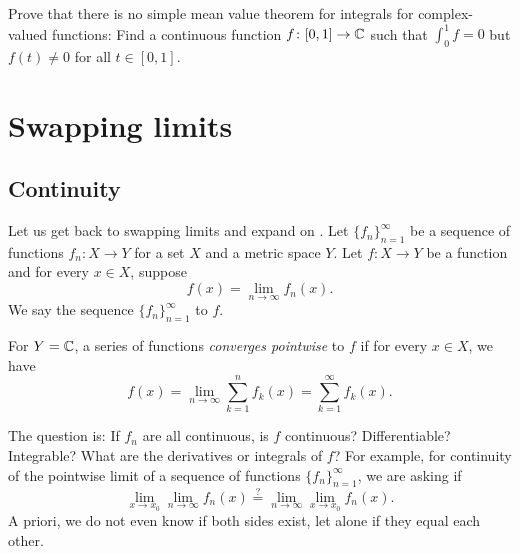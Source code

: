 \begin{exercise}
Prove that there is no simple mean value theorem for integrals
for complex-valued
functions:  Find a continuous function $f \colon [0,1] \to {\mathbb{C}}$ such that
$\int_0^1 f = 0$ but $f(t) \not= 0$ for all $t \in [0,1]$.
\end{exercise}



\sectionnewpage
\section{Swapping limits}
\label{sec:swaplim}



\subsection{Continuity}

Let us get back to swapping limits and expand on
.
Let $\{ f_n \}_{n=1}^\infty$ be a sequence
of functions $f_n \colon X \to Y$ for a set $X$ and a metric space $Y$.
Let $f \colon X \to Y$ be a
function and for every $x \in X$, suppose
\begin{equation*}
f(x) = \lim_{n\to \infty} f_n(x) .
\end{equation*}
We say the sequence $\{ f_n \}_{n=1}^\infty$
\emph{} to $f$.

For $Y={\mathbb{C}}$, a series of functions
\emph{converges pointwise} to $f$ if
for every $x \in X$, we have
\begin{equation*}
f(x) = \lim_{n\to \infty} \sum_{k=1}^n f_k(x) =
\sum_{k=1}^\infty f_k(x) .
\end{equation*}

\medskip

The question is:
If $f_n$ are all continuous, is $f$ continuous?  Differentiable?
Integrable?  What are the derivatives or integrals of $f$?
For example, for continuity of the pointwise limit of a sequence
of functions
$\{ f_n \}_{n=1}^\infty$, we are asking if
\begin{equation*}
\lim_{x\to x_0} \lim_{n\to\infty} f_n(x)
\overset{?}{=}
\lim_{n\to\infty} \lim_{x\to x_0} f_n(x) .
\end{equation*}
A priori, we do not even know if both sides exist, let alone if they equal each other.

